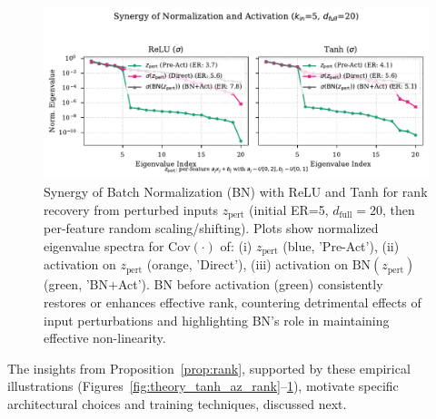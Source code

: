 \documentclass{article}
\begin{document}
\begin{figure}[ht!]
    \centering
    \includegraphics[width=0.7\linewidth]{figures/theory_joint_norm_activation_rank.pdf} %
    \caption{Synergy of Batch Normalization (BN) with ReLU and Tanh for rank recovery from perturbed inputs $z_{\text{pert}}$ (initial ER=5, $d_{\text{full}}=20$, then per-feature random scaling/shifting). Plots show normalized eigenvalue spectra for $\mathrm{Cov}(\cdot)$ of: (i) $z_{\text{pert}}$ (blue, 'Pre-Act'), (ii) activation on $z_{\text{pert}}$ (orange, 'Direct'), (iii) activation on $\text{BN}(z_{\text{pert}})$ (green, 'BN+Act'). BN before activation (green) consistently restores or enhances effective rank, countering detrimental effects of input perturbations and highlighting BN's role in maintaining effective non-linearity.}
    \label{fig:theory_joint_norm_activation_rank}
\end{figure}

The insights from Proposition~\ref{prop:rank}, supported by these empirical illustrations (Figures~\ref{fig:theory_tanh_az_rank}--\ref{fig:theory_joint_norm_activation_rank}), motivate specific architectural choices and training techniques, discussed next.
\end{document}
